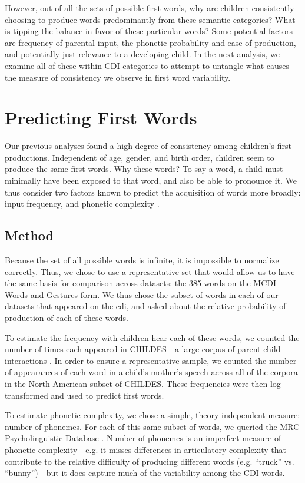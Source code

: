 \documentclass[10pt,letterpaper]{article}
\begin{document}
However, out of all the sets of possible first words, why are children consistently choosing to produce words predominantly from these semantic categories? What is tipping the balance in favor of these particular words? Some potential factors are frequency of parental input, the phonetic probability and ease of production, and potentially just relevance to a developing child. In the next analysis, we examine all of these within CDI categories to attempt to untangle what causes the measure of consistency we observe in first word variability.


\section{Predicting First Words}

Our previous analyses found a high degree of consistency among children's first productions. Independent of age, gender, and birth order, children seem to produce the same first words. Why these words? To say a word, a child must minimally have been exposed to that word, and also be able to pronounce it. We thus consider two factors known to predict the acquisition of words more broadly: input frequency, and phonetic complexity \cite{goodman2008}.

\subsection{Method}

Because the set of all possible words is infinite, it is impossible to normalize correctly. Thus, we chose to use a representative set that would allow us to have the same basis for comparison across datasets: the 385 words on the MCDI Words and Gestures form. We thus chose the subset of words in each of our datasets that appeared on the cdi, and asked about the relative probability of production of each of these words.

To estimate the frequency with children hear each of these words, we counted the number of times each appeared in CHILDES---a large corpus of parent-child interactions \cite{macwhinney2000}. In order to ensure a representative sample, we counted the number of appearances of each word in a child's mother's speech across all of the corpora in the North American subset of CHILDES. These frequencies were then log-transformed and used to predict first words.

To estimate phonetic complexity, we chose a simple, theory-independent measure: number of phonemes. For each of this same subset of words, we queried the MRC Psycholinguistic Database \cite{Wilson1988}. Number of phonemes is an imperfect measure of phonetic complexity---e.g. it misses differences in articulatory complexity that contribute to the relative difficulty of producing different words (e.g. ``truck'' vs. ``bunny'')---but it does capture much of the variability among the CDI words.
\end{document}
